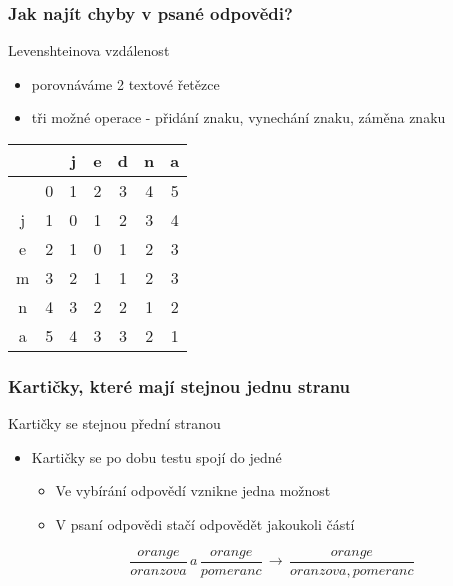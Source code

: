 \documentclass[11pt, xcolor=table]{beamer}
\begin{document}
    \begin{frame}
        \frametitle{Jak najít chyby v psané odpovědi?}
        Levenshteinova vzdálenost
        \begin{itemize}
            \item porovnáváme 2 textové řetězce
            \item tři možné operace - přidání znaku, vynechání znaku, záměna znaku
        \end{itemize}
        \begin{table}
            \centering
            \label{tab:1}
            \begin{tabular}{ | c | c | c | c | c | c | c | }
                \hline
                &   & j & e & d & n & a \\
                \hline
                & \cellcolor{lightgray}0 & 1 & 2 & 3 & 4 & 5 \\
                \hline
                j & 1 & \cellcolor{lightgray}0 & 1 & 2 & 3 & 4 \\
                \hline
                e & 2 & 1 & \cellcolor{lightgray}0 & 1 & 2 & 3 \\
                \hline
                m & 3 & 2 & 1 & \cellcolor{lightgray}1 & 2 & 3 \\
                \hline
                n & 4 & 3 & 2 & 2 & \cellcolor{lightgray}1 & 2 \\
                \hline
                a & 5 & 4 & 3 & 3 & 2 & \cellcolor{lightgray}1 \\
                \hline
            \end{tabular}
        \end{table}
    \end{frame}
    \begin{frame}
        \frametitle{Kartičky, které mají stejnou jednu stranu}
        Kartičky se stejnou přední stranou
        \begin{itemize}
            \item Kartičky se po dobu testu spojí do jedné
            \begin{itemize}
                \item Ve vybírání odpovědí vznikne jedna možnost
                \item V psaní odpovědi stačí odpovědět jakoukoli částí
            \end{itemize}
            \bigskip
            $$\frac{orange}{oranzova}\, a\,\frac{orange}{pomeranc}\,\rightarrow\,\frac{orange}{oranzova, pomeranc}$$
        \end{itemize}
    \end{frame}
\end{document}
